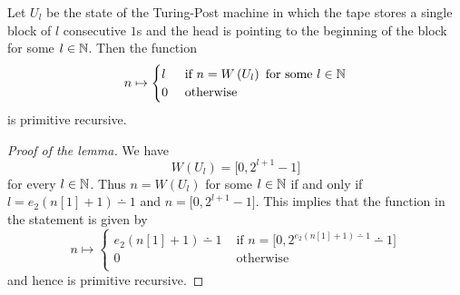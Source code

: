 \documentclass[10pt]{amsart}
\begin{document}
\begin{lemma}\label{lemma:inverse_Wang_encoding_of_single_unary_number_is_primitive_recursive}
	Let $U_l$ be the state of the Turing-Post machine in which the tape stores a single block of $l$ consecutive $1$s and the head is pointing to the beginning of the block for some $l \in {\mathbb N}$. Then the function
	$$n \mapsto \begin{cases}
			l & \mbox{ if }n = W\left(U_l\right)\mbox{ for some }l\in {\mathbb N} \\
			0 & \mbox{ otherwise }
		\end{cases}
	$$
	is primitive recursive.
\end{lemma}
\begin{proof}[Proof of the lemma]
	We have
	$$W(U_l) = \pmb{[}0, 2^{l+1} - 1\pmb{]}$$
	for every $l \in {\mathbb N}$. Thus $n = W(U_l)$ for some $l \in {\mathbb N}$ if and only if $l = e_2(n[1] + 1) \dotminus 1$ and $n = \pmb{[}0,2^{l+1} - 1\pmb{]}$. This implies that the function in the statement is given by
	$$n \mapsto \begin{cases}
			e_2(n[1] + 1) \dotminus 1 & \mbox{ if }n = \pmb{[}0,2^{e_2(n[1] + 1) \dotminus 1} \dotminus 1\pmb{]} \\
			0                         & \mbox{ otherwise }                                                       \\
		\end{cases}$$
	and hence is primitive recursive.
\end{proof}
\end{document}
